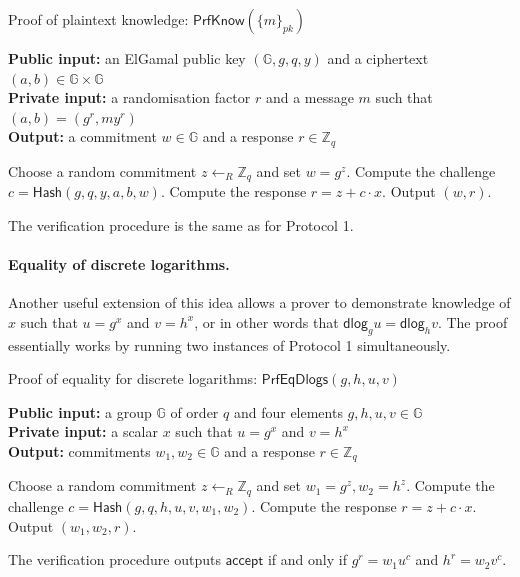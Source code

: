\documentclass[12pt,a4paper]{article}
\newcommand{\dlog}{\mathsf{dlog}}
\theoremstyle{definition}
\begin{document}
\begin{algorithm}\caption{Proof of plaintext knowledge: $\mathsf{PrfKnow}(\{m\}_{pk})$}\label{prot:ProofKnowPlaintext}
    \textbf{Public input:} an ElGamal public key $(\mathbb{G}, g, q, y)$ and a ciphertext $(a, b)\in\mathbb{G}\times\mathbb{G}$\\
    \textbf{Private input:} a randomisation factor $r$ and a message $m$ such that $(a, b) = (g^r, my^r)$\\
    \textbf{Output:} a commitment $w\in\mathbb{G}$ and a response $r\in\mathbb{Z}_q$
    \begin{algorithmic}[1]
        \State Choose a random commitment $z\leftarrow_R\mathbb{Z}_q$ and set $w = g^z$.
        \State Compute the challenge $c=\mathsf{Hash}(g, q, y, a, b, w)$.
        \State Compute the response $r=z+c\cdot x$.
        \State Output $(w, r)$.
    \end{algorithmic}
\end{algorithm}
The verification procedure is the same as for Protocol 1.

\paragraph{Equality of discrete logarithms.}
Another useful extension of this idea allows a prover to demonstrate knowledge of $x$ such that $u=g^x$ and $v=h^x$, or in other words that $\dlog_g u=\dlog_h v$. The proof essentially works by running two instances of Protocol 1 simultaneously.

\begin{algorithm}\caption{Proof of equality for discrete logarithms: $\mathsf{PrfEqDlogs}(g, h, u, v)$}\label{prot:ProofEqDlog}
    \textbf{Public input:} a group $\mathbb{G}$ of order $q$ and four elements $g, h, u, v\in\mathbb{G}$\\
    \textbf{Private input:} a scalar $x$ such that $u = g^x$ and $v = h^x$\\
    \textbf{Output:} commitments $w_1, w_2\in\mathbb{G}$ and a response $r\in\mathbb{Z}_q$
    \begin{algorithmic}[1]
        \State Choose a random commitment $z\leftarrow_R\mathbb{Z}_q$ and set $w_1 = g^z, w_2=h^z$.
        \State Compute the challenge $c=\mathsf{Hash}(g, q, h, u, v, w_1, w_2)$.
        \State Compute the response $r=z+c\cdot x$.
        \State Output $(w_1, w_2, r)$.
    \end{algorithmic}
\end{algorithm}
The verification procedure outputs $\mathsf{accept}$ if and only if $g^r=w_1u^c$ and $h^r=w_2v^c$.
\end{document}
